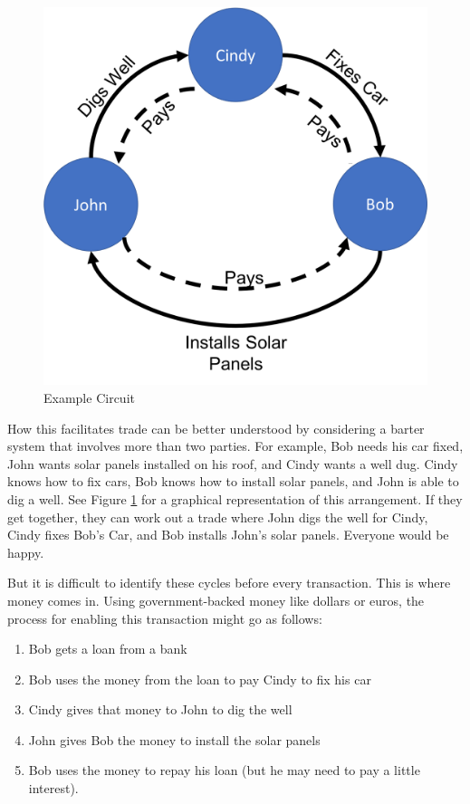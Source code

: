 \documentclass[runningheads]{llncs}
\newcommand{\figref}[1]{Figure \ref{#1}}
\begin{document}
\begin{figure}[h]
    \centering
    \includegraphics[scale=0.3]{ExampleCircuit.png}
    \caption{Example Circuit}
    \label{fig:liftProt}
\end{figure}
How this facilitates trade can be better understood by considering a barter system that involves more than two parties. 
For example, Bob needs his car fixed, John wants solar panels installed on his roof, and Cindy wants a well dug. Cindy knows how to fix cars, Bob knows how to install solar panels, and John is able to dig a well. See \figref{fig:liftProt} for a graphical representation of this arrangement. If they get together, they can work out a trade where John digs the well for Cindy, Cindy fixes Bob's Car, and Bob installs John's solar panels. Everyone would be happy.

But it is difficult to identify these cycles before every transaction. This is where money comes in. Using government-backed money like dollars or euros, the process for enabling this transaction might go as follows:
\begin{enumerate}
\item Bob gets a loan from a bank
\item Bob uses the money from the loan to pay Cindy to fix his car
\item Cindy gives that money to John to dig the well
\item John gives Bob the money to install the solar panels
\item Bob uses the money to repay his loan (but he may need to pay a little 
interest).
\end{enumerate}
\end{document}
